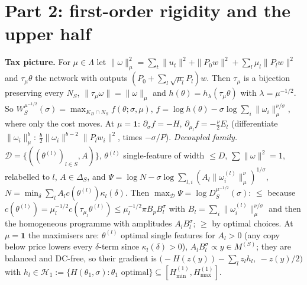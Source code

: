 \documentclass[11pt]{article}
\theoremstyle{remark}\newtheorem{remark}[theorem]{Remark}
\begin{document}
\section{Part 2: first-order rigidity and the upper half}
\textbf{Tax picture.} For $\mu\in\Lambda$ let $\|\omega\|_\mu^2=\sum_t\|u_t\|^2+\|P_0w\|^2+\sum_l\mu_l\|P_lw\|^2$ and
$\tau_\mu\theta$ the network with outputs $(P_0+\sum_l\sqrt{\mu_l}P_l)w$. Then $\tau_\mu$ is a bijection preserving every $N_S$,
$\|\tau_\mu\omega\|=\|\omega\|_\mu$ and $h(\theta)=h_\lambda(\tau_\mu\theta)$ with $\lambda=\mu^{-1/2}$. So
$W^{\mu^{-1/2}}_S(\sigma)=\max_{K_D\cap N_S}f(\theta;\sigma,\mu)$, $f=\log h(\theta)-\sigma\log\sum_i\|\omega_i\|_\mu^{\nu/\sigma}$,
where only the cost moves. At $\mu=\mathbf 1$: $\partial_\sigma f=-H$, $\partial_{\mu_l}f=-\frac\nu2E_l$ (differentiate
$\|\omega_i\|_\mu^b$: $\frac b2\|\omega_i\|^{b-2}\|P_lw_i\|^2$, times $-\sigma/P$).
\emph{Decoupled family.} $\mathcal D=\{((\theta^{(l)})_{l\in S},A)\}$, $\theta^{(l)}$ single-feature of width $\le D$,
$\sum\|\omega\|^2=1$, relabelled to $l$, $A\in\Delta_S$, and
$\Psi=\log N-\sigma\log\sum_{l,i}(A_l\|\omega^{(l)}_i\|_\mu^\nu)^{1/\sigma}$, $N=\min_\delta\sum_lA_lc(\theta^{(l)})\kappa_l(\delta)$.
Then $\max_{\mathcal D}\Psi=\log D^{\mu^{-1/2}}_S(\sigma)$: $\le$ because $c(\theta^{(l)})=\mu_l^{-1/2}c(\tau_{\mu_l}\theta^{(l)})\le
\mu_l^{-1/2}\pi B_pB_l^\sigma$ with $B_l=\sum_i\|\omega_i^{(l)}\|_\mu^{\nu/\sigma}$ and then the homogeneous programme with amplitudes
$A_lB_l^\sigma$; $\ge$ by optimal choices. At $\mu=\mathbf1$ the maximisers are: $\theta^{(l)}$ optimal single features for
$A_l>0$ (any copy below price lowers every $\delta$-term since $\kappa_l(\delta)>0$), $A_lB_l^\sigma\propto y\in M^{(S)}$;
they are balanced and DC-free, so their gradient is
$\big(-H(z(y))-\sum_lz_lh_l,\ -z(y)/2\big)$ with $h_l\in\mathcal H_1:=\{H(\theta_1,\sigma):\theta_1\text{ optimal}\}\subseteq[H^{(1)}_{\min},H^{(1)}_{\max}]$.
\end{document}
